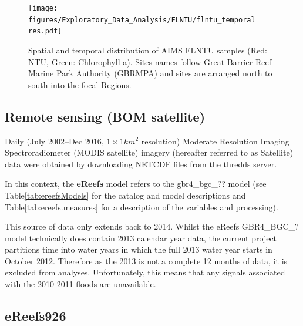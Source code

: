  

\begin{figure}[ptbh] \texttt{[image: figures/Exploratory\_Data\_Analysis/FLNTU/flntu\_temporal\\res.pdf]}
\caption{Spatial and temporal distribution of AIMS FLNTU samples (Red: NTU, Green: Chlorophyll-a).
Sites names follow Great Barrier Reef Marine Park Authority (GBRMPA) and sites are arranged north to
south into the focal Regions.}\label{fig:flntu_temporal}
\end{figure}

\clearpage

\subsection{Remote sensing (BOM satellite)}

Daily (July 2002--Dec 2016, $1\times 1 km^2$ resolution) Moderate Resolution Imaging
Spectroradiometer (MODIS satellite) imagery (hereafter referred to as Satellite) data were obtained
by downloading NETCDF files from the thredds server.



 






In this context, the \textbf{eReefs} model refers to the
gbr4\_bgc\_?? model (see Table\ref{tab:ereefsModels} for the catalog and model descriptions and
Table\ref{tab:ereefs.measures} for a description of the variables and processing).

This source of data only extends back to 2014. Whilst the eReefs GBR4\_BGC\_? model technically does
contain 2013 calendar year data, the current project partitions time into water years in which the
full 2013 water year starts in October 2012.  Therefore as the 2013 is not a complete 12 months of
data, it is excluded from analyses. Unfortunately, this means that any signals associated with the
2010-2011 floods are unavailable.
 
    
      

\subsection{eReefs926}

